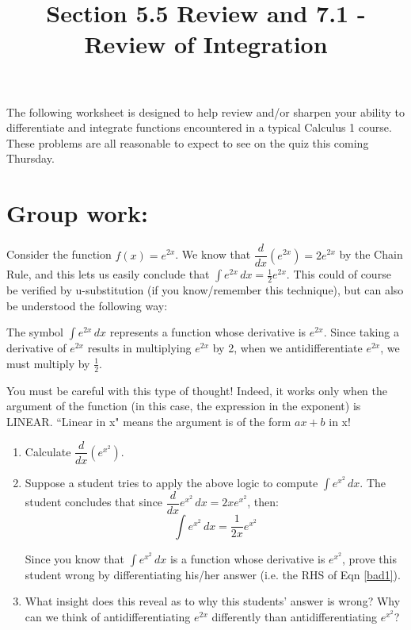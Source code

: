 \documentclass[]{ximera}
\title{Section 5.5 Review and 7.1 - Review of Integration}
\begin{document}
\begin{abstract}		\end{abstract}
\maketitle



The following worksheet is designed to help review and/or sharpen your ability to differentiate and integrate functions encountered in a typical Calculus 1 course.  These problems are all reasonable to expect to see on the quiz this coming Thursday.


\section{Group work:}



\begin{problem}
Consider the function $f(x)=e^{2x}$.  We know that $\dfrac{d}{dx} \left( e^{2x} \right) = 2 e^{2x}$ by the Chain Rule, and this lets us easily conclude that $\int e^{2x} \, dx = \frac{1}{2} e^{2x}$.  This could of course be verified by u-substitution (if you know/remember this technique), but can also be understood the following way:

The symbol $\int e^{2x} \, dx$ represents a function whose derivative is $e^{2x}$.  Since taking a derivative of $e^{2x}$ results in multiplying $e^{2x}$ by 2, when we antidifferentiate $e^{2x}$, we must multiply by $\frac{1}{2}$.  

You must be careful with this type of thought!  Indeed, it works only when the argument of the function (in this case, the expression in the exponent) is LINEAR.  ``Linear in x" means the argument is of the form $ax+b$ in x!

	\begin{enumerate}
	
	\item  Calculate $\dfrac{d}{dx} \left(e^{x^2} \right) $.
				
		
	\item Suppose a student tries to apply the above logic to compute $\int e^{x^2} \, dx$.  The student concludes that since $\dfrac{d}{dx} e^{x^2} \, dx = 2x e^{x^2} $, then: 
\begin{equation}
 \int e^{x^2} \, dx = \dfrac{1}{2x} e^{x^2} \label{bad1}
\end{equation}

Since you know that $\int e^{x^2} \, dx$ is a function whose derivative is $e^{x^2}$, prove this student wrong by differentiating his/her answer (i.e. the RHS of Eqn \ref{bad1}).  
	
		
	\item 	What insight does this reveal as to why this students' answer is wrong?  Why can we think of antidifferentiating $e^{2x}$ differently than antidifferentiating $e^{x^2}$?
		
			
	\end{enumerate}
		
		
\end{problem}
\end{document}
